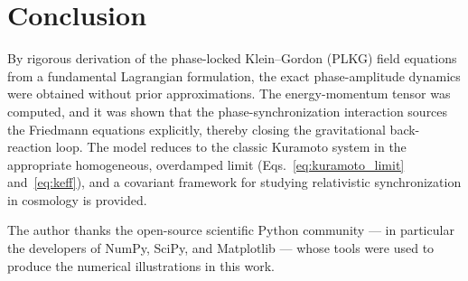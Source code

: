 
\section{Conclusion}
\label{sec:conclusion}

By rigorous derivation of the phase-locked Klein--Gordon (PLKG) field equations from a fundamental Lagrangian formulation, the exact phase-amplitude dynamics were obtained without prior approximations.
The energy-momentum tensor was computed, and it was shown that the phase-synchronization interaction sources the Friedmann equations explicitly, thereby closing the gravitational back-reaction loop.
The model reduces to the classic Kuramoto system in the appropriate homogeneous, overdamped limit (Eqs.~\eqref{eq:kuramoto_limit} and~\eqref{eq:keff}), and a covariant framework for studying relativistic synchronization in cosmology is provided.

\begin{acknowledgments}
The author thanks the open-source scientific Python community --- in particular the developers of
NumPy, SciPy, and Matplotlib --- whose tools were used to produce the numerical illustrations in this work.
\end{acknowledgments}
